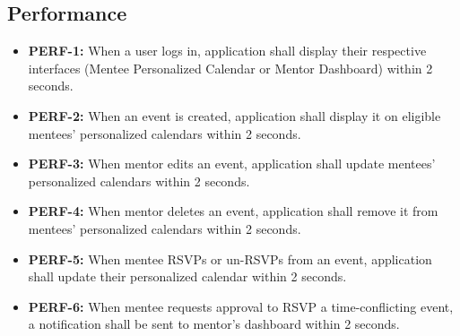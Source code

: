 \subsection{Performance}

\begin{itemize}
    \item \textbf{PERF-1:} When a user logs in, application shall display their
    respective interfaces (Mentee Personalized Calendar or Mentor Dashboard)
    within 2 seconds.

    \item \textbf{PERF-2:} When an event is created, application shall display
    it on eligible mentees' personalized calendars within 2 seconds.

    \item \textbf{PERF-3:} When mentor edits an event, application shall update
    mentees' personalized calendars within 2 seconds.

    \item \textbf{PERF-4:} When mentor deletes an event, application shall
    remove it from mentees' personalized calendars within 2 seconds.

    \item \textbf{PERF-5:} When mentee RSVPs or un-RSVPs from an event,
    application shall update their personalized calendar within 2 seconds.

    \item \textbf{PERF-6:} When mentee requests approval to RSVP a
    time-conflicting event, a notification shall be sent to mentor's dashboard
    within 2 seconds.
\end{itemize}
